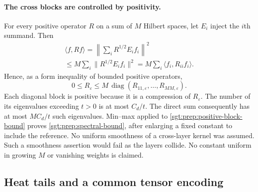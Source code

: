 \documentclass[aps,pra,reprint,superscriptaddress,longbibliography]{revtex4-2}
\begin{document}
\paragraph{The cross blocks are controlled by positivity.}
For every positive operator $R$ on a sum of $M$ Hilbert spaces, let
$E_i$ inject the $i$th summand. Then
\[
\begin{gathered}
 \langle f,Rf\rangle
 =\left\|\sum_iR^{1/2}E_if_i\right\|^2
\\
 \le M\sum_i\|R^{1/2}E_if_i\|^2
 =M\sum_i\langle f_i,R_{ii}f_i\rangle.
\end{gathered}
\]
Hence, as a form inequality of bounded positive operators,
\begin{equation}
 0\le R_\varepsilon\le
 M\,\operatorname{diag}(R_{11,\varepsilon},\ldots,R_{MM,\varepsilon}).
 \label{sgt:prep:positive-block-bound}
\end{equation}
Each diagonal block is positive because it is a compression of
$R_\varepsilon$. The number of its eigenvalues exceeding $t>0$ is at
most $C_d/t$. The direct sum consequently has at most $MC_d/t$ such
eigenvalues. Min--max applied to
\eqref{sgt:prep:positive-block-bound} proves
\eqref{sgt:prep:spectral-bound}, after enlarging a fixed constant to
include the reference. No uniform smoothness of a cross-layer kernel
was assumed. Such a smoothness assertion would fail as the layers
collide. No constant uniform in growing $M$ or vanishing weights is
claimed.

\subsection{Heat tails and a common tensor encoding}
\label{sgt:prep:encoding}
\end{document}
